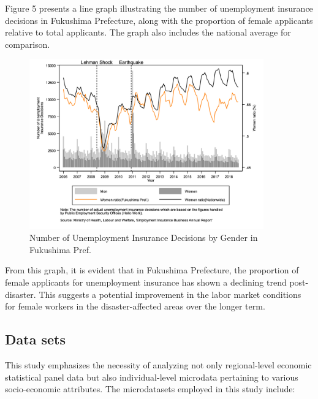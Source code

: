 \documentclass[12pt,halfline,a4paper]{ouparticle}
\begin{document}
\newpage

Figure 5 presents a line graph illustrating the number of unemployment insurance decisions in Fukushima Prefecture, along with the proportion of female applicants relative to total applicants. The graph also includes the national average for comparison. 

\begin{figure}[h!]
    \centering
    \includegraphics[width=0.9\textwidth]{Number of Unemployment Insurance decisions.jpg}  %
    \caption{Number of Unemployment Insurance Decisions by Gender in Fukushima Pref.}
    \label{fig:employment_insurance_decisions}
\end{figure}

From this graph, it is evident that in Fukushima Prefecture, the proportion of female applicants for unemployment insurance has shown a declining trend post-disaster. This suggests a potential improvement in the labor market conditions for female workers in the disaster-affected areas over the longer term.

\newpage

\subsection{Data sets}
\label{sec5.1}

This study emphasizes the necessity of analyzing not only regional-level economic statistical panel data but also individual-level microdata pertaining to various socio-economic attributes. The microdatasets employed in this study include:
\end{document}
